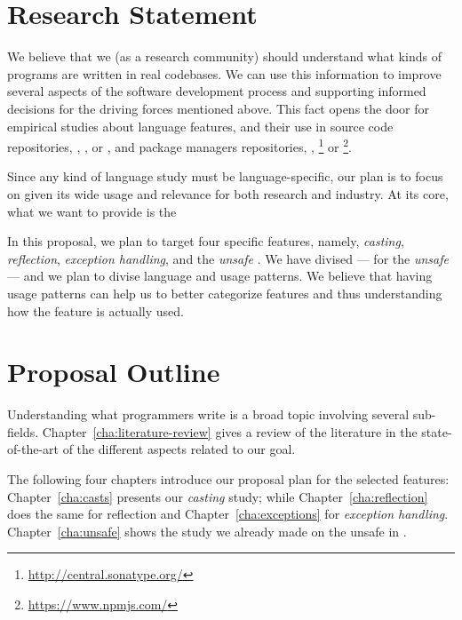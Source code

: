 \section{Research Statement}

We believe that we (as a research community) should understand what kinds of programs are written in real codebases.
We can use this information to improve several aspects of the software development process and supporting informed decisions for the driving forces mentioned above.
This fact opens the door for empirical studies about language features, and their use in source code repositories, \eg{}, \github{}, \gitlab{} or \bitbucket{}, and package managers repositories, \eg{}, \mavencentral{}\footnote{\url{http://central.sonatype.org/}} or
\npm{}\footnote{\url{https://www.npmjs.com/}}.

Since any kind of language study must be language-specific, our plan is to focus on \java{} given its wide usage and relevance for both research and industry.
At its core, what we want to provide is the


In this proposal, we plan to target four specific \java{} features, namely, \emph{casting}, \emph{reflection}, \emph{exception handling}, and the \emph{unsafe \api{}}.
We have divised --- for the \emph{unsafe} \api{} --- and we plan to divise language and \api{} usage patterns.
We believe that having usage patterns can help us to better categorize features and thus understanding how the feature is actually used.


\section{Proposal Outline}

Understanding what programmers write is a broad topic involving several sub-fields.
Chapter~\ref{cha:literature-review} gives a review of the literature in the state-of-the-art of the different aspects related to our goal. 

The following four chapters introduce our proposal plan for the selected features:
Chapter~\ref{cha:casts} presents our \emph{casting} study;
while Chapter~\ref{cha:reflection} does the same for reflection and
Chapter~\ref{cha:exceptions} for \emph{exception handling}.
Chapter~\ref{cha:unsafe} shows the study we already made on the unsafe \api{} in \java{}.

